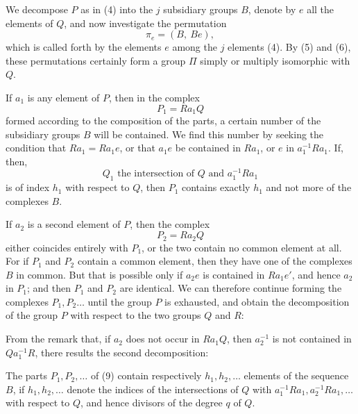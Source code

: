 We decompose $P$ as in (4) into the $j$ subsidiary groups $B$, denote
by $e$ all the elements of $Q$, and now investigate the permutation
\[
\pi_e = (B,\ Be),
\]
which is called forth by the elements $e$ among the $j$ elements (4).
By (5) and (6), these permutations certainly form a group $\Pi$
simply or multiply isomorphic with $Q$.

If $a_1$ is any element of $P$, then in the complex
\[
P_1 = Ra_1Q
\]
formed according to the composition of the parts, a certain number of the
subsidiary groups $B$ will be contained. We find this
number by seeking the condition that
$Ra_1 = Ra_1e$, or that $a_1e$ be contained in $Ra_1$, or $e$ in $a_1^{-1}Ra_1$.
If, then,
\[
Q_1 \text{ the intersection of } Q \text{ and } a_1^{-1}Ra_1
\]
is of index $h_1$ with respect to $Q$, then $P_1$ contains exactly $h_1$ and not
more of the complexes $B$.

If $a_2$ is a second element of $P$, then the complex
\[
P_2 = Ra_2Q
\]
either coincides entirely with $P_1$, or the two contain
no common element at all. For if $P_1$ and $P_2$ contain a
common element, then they have one of the complexes $B$ in common. But that is possible only if $a_2e$ is contained in $Ra_1e'$,
and hence $a_2$ in $P_1$; and then $P_1$ and $P_2$ are identical.
We can therefore continue forming the complexes $P_1, P_2 \ldots$ until the group $P$ is exhausted, and obtain the decomposition of the group $P$ with respect to the two groups $Q$ and $R$:

From the remark that, if $a_2$ does not occur in $Ra_1Q$,
then $a_2^{-1}$ is not contained in $Qa_1^{-1}R$, there results the second
decomposition:

The parts $P_1, P_2, \ldots$ of (9) contain respectively $h_1, h_2, \ldots$
elements of the sequence $B$, if $h_1, h_2, \ldots$ denote the indices of the intersections of $Q$ with $a_1^{-1}Ra_1, a_2^{-1}Ra_1, \ldots$ with respect to $Q$, and hence %
divisors of the degree $q$ of $Q$.

